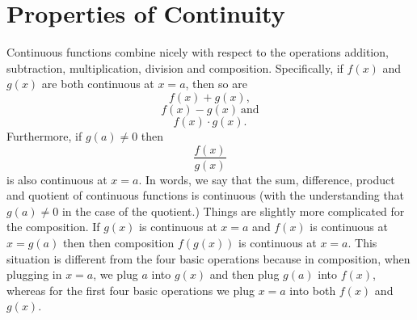 \documentclass[handout]{ximera}
\begin{document}
\section{Properties of Continuity}



Continuous functions combine nicely with respect to the operations addition, subtraction, multiplication, 
division and composition. Specifically, if $f(x)$ and $g(x)$ are both continuous at $x = a$, then so are
\[f(x) + g(x),\]
\[f(x) - g(x) \ \text{and}\]
\[f(x) \cdot g(x).\]
Furthermore, if $g(a) \neq 0$ then 
\[\frac{f(x)}{g(x)}\]
is also continuous at $x = a$. 
In words, we say that the sum, difference, product and quotient of continuous functions is continuous 
(with the understanding that $g(a) \neq 0$ in the case of the quotient.)
Things are slightly more complicated for the composition. If $g(x)$ is continuous at $x = a$ and $f(x)$ is 
continuous at $x = g(a)$ then then composition $f(g(x))$ is continuous at $x = a$. This situation is 
different from the four basic operations because in composition, when plugging in $x = a$, we plug $a$ 
into $g(x)$ and then plug $g(a)$ into $f(x)$,
whereas for the first four basic operations we plug $x = a$ into both $f(x)$ and $g(x)$.



 
\begin{center}
\begin{foldable}
\end{foldable}
\end{center}
\end{document}

